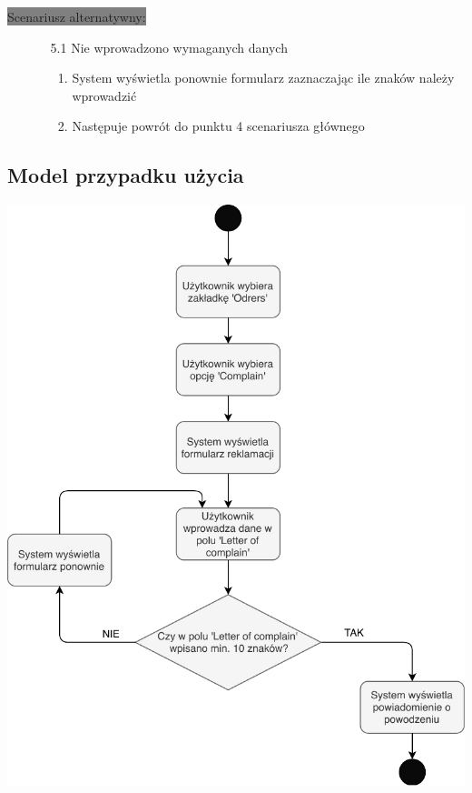 \documentclass[12pt]{report}
\begin{document}
		\colorbox{grey}{Scenariusz alternatywny:}
		\begin{enumerate}\addtocounter{enumi}{2}
			\item[]
			\begin{enumerate}
				\item[5.1] Nie wprowadzono wymaganych danych
				\begin{enumerate}
					\item System wyświetla ponownie formularz zaznaczając ile znaków należy wprowadzić
					\item Następuje powrót do punktu 4 scenariusza głównego
				\end{enumerate}
			\end{enumerate}
		\end{enumerate}
		
		\newpage
		\subsection{Model przypadku użycia}
			\begin{center}
			\includegraphics[width=400pt]{reklamacja.pdf}
		\end{center}
		\newpage
\end{document}
